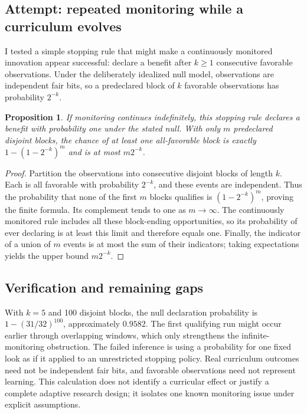 \documentclass[11pt]{article}
\newtheorem{proposition}{Proposition}
\begin{document}
\subsection{Attempt: repeated monitoring while a curriculum evolves}
I tested a simple stopping rule that might make a continuously monitored innovation appear successful: declare a benefit after $k\ge1$ consecutive favorable observations. Under the deliberately idealized null model, observations are independent fair bits, so a predeclared block of $k$ favorable observations has probability $2^{-k}$.
\begin{proposition}
If monitoring continues indefinitely, this stopping rule declares a benefit with probability one under the stated null. With only $m$ predeclared disjoint blocks, the chance of at least one all-favorable block is exactly $1-(1-2^{-k})^m$ and is at most $m2^{-k}$.
\end{proposition}
\begin{proof}
Partition the observations into consecutive disjoint blocks of length $k$. Each is all favorable with probability $2^{-k}$, and these events are independent. Thus the probability that none of the first $m$ blocks qualifies is $(1-2^{-k})^m$, proving the finite formula. Its complement tends to one as $m\to\infty$. The continuously monitored rule includes all these block-ending opportunities, so its probability of ever declaring is at least this limit and therefore equals one. Finally, the indicator of a union of $m$ events is at most the sum of their indicators; taking expectations yields the upper bound $m2^{-k}$.
\end{proof}
\subsection{Verification and remaining gaps}
With $k=5$ and 100 disjoint blocks, the null declaration probability is $1-(31/32)^{100}$, approximately $0.9582$. The first qualifying run might occur earlier through overlapping windows, which only strengthens the infinite-monitoring obstruction. The failed inference is using a probability for one fixed look as if it applied to an unrestricted stopping policy. Real curriculum outcomes need not be independent fair bits, and favorable observations need not represent learning. This calculation does not identify a curricular effect or justify a complete adaptive research design; it isolates one known monitoring issue under explicit assumptions.
\end{document}

